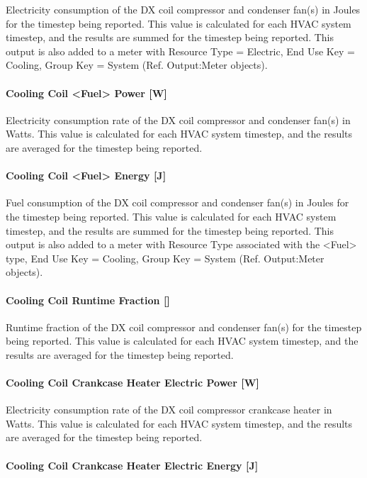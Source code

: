 Electricity consumption of the DX coil compressor and condenser fan(s) in Joules for the timestep being reported. This value is calculated for each HVAC system timestep, and the results are summed for the timestep being reported. This output is also added to a meter with Resource Type = Electric, End Use Key = Cooling, Group Key = System (Ref. Output:Meter objects).

\paragraph{Cooling Coil <Fuel> Power {[}W{]}}

Electricity consumption rate of the DX coil compressor and condenser fan(s) in Watts. This value is calculated for each HVAC system timestep, and the results are averaged for the timestep being reported.

\paragraph{Cooling Coil <Fuel> Energy {[}J{]}}

Fuel consumption of the DX coil compressor and condenser fan(s) in Joules for the timestep being reported. This value is calculated for each HVAC system timestep, and the results are summed for the timestep being reported. This output is also added to a meter with Resource Type associated with the <Fuel> type, End Use Key = Cooling, Group Key = System (Ref. Output:Meter objects).

\paragraph{Cooling Coil Runtime Fraction {[]}}

Runtime fraction of the DX coil compressor and condenser fan(s) for the timestep being reported. This value is calculated for each HVAC system timestep, and the results are averaged for the timestep being reported.

\paragraph{Cooling Coil Crankcase Heater Electric Power {[}W{]}}

Electricity consumption rate of the DX coil compressor crankcase heater in Watts. This value is calculated for each HVAC system timestep, and the results are averaged for the timestep being reported.

\paragraph{Cooling Coil Crankcase Heater Electric Energy {[}J{]}}

